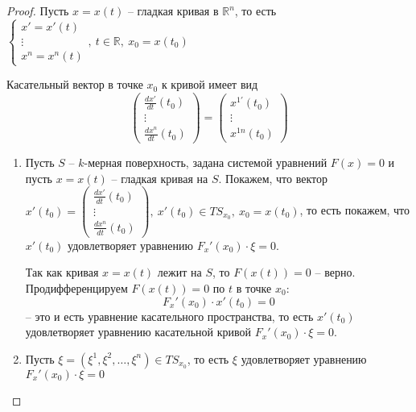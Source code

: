 \documentclass{report}
\theoremstyle{definition}
\begin{document}
\begin{proof}
  Пусть $x = x(t)$ -- гладкая кривая в $\mathbb{R}^n$, то есть \\
  $\left\{\begin{array}{l}
      x' = x'(t) \\
      \vdots     \\
      x^n = x^n(t)
    \end{array}\right., \ t \in \mathbb{R}, \ x_0 = x(t_0)$

  Касательный вектор в точке $x_0$ к кривой имеет вид
  \begin{equation*}
    \left(\begin{array}{c}
      \frac{dx'}{dt}(t_0) \\
      \vdots              \\
      \frac{dx^n}{dt}(t_0)
    \end{array}\right) = \left(\begin{array}{c}
      x^{1'}(t_0) \\
      \vdots      \\
      x^{1n}(t_0)
    \end{array}\right)
  \end{equation*}
  \begin{enumerate}
    \item Пусть $S$ -- $k$-мерная поверхность, задана системой уравнений $F(x) = 0$ и пусть $x = x(t)$ -- гладкая кривая на $S$. Покажем, что вектор $x'(t_0) = \left(\begin{array}{c}
                \frac{dx'}{dt}(t_0) \\
                \vdots              \\
                \frac{dx^n}{dt}(t_0)
              \end{array}\right), \ x'(t_0) \in TS_{x_0}, \ x_0 = x(t_0)$, то есть покажем, что $x'(t_0)$ удовлетворяет уравнению $F_x'(x_0)\cdot \xi=0$.

          Так как кривая $x = x(t)$ лежит на $S$, то $F(x(t)) = 0$ -- верно. Продифференцируем $F(x(t)) = 0$ по $t$ в точке $x_0$:
          \begin{equation*}
            F_x'(x_0) \cdot x'(t_0) = 0
          \end{equation*}
          -- это и есть уравнение касательного пространства, то есть $x'(t_0)$ удовлетворяет уравнению касательной кривой $F_x'(x_0)\cdot \xi = 0$.

    \item Пусть $\xi = (\xi^1,\xi^2,\ldots,\xi^n) \in TS_{x_0}$, то есть $\xi$ удовлетворяет уравнению $F_x'(x_0)\cdot \xi = 0$
  \end{enumerate}


\end{proof}
\end{document}
